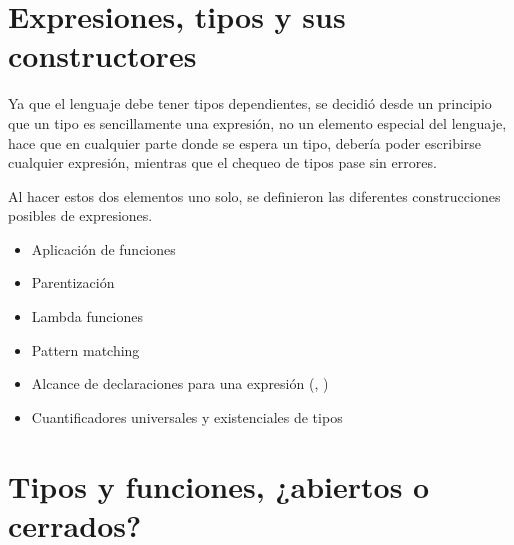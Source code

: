 \section{Expresiones, tipos y sus constructores}

\begin{blueleft}
Ya que el lenguaje debe tener tipos dependientes, se decidió desde un principio que un tipo es sencillamente una expresión, no un elemento especial del lenguaje, hace que en cualquier parte donde se espera un tipo, debería poder escribirse cualquier expresión, mientras que el chequeo de tipos pase sin errores.

Al hacer estos dos elementos uno solo, se definieron las diferentes construcciones posibles de expresiones.

\begin{itemize}
    \item Aplicación de funciones
    \item Parentización
    \item Lambda funciones
    \item Pattern matching
    \item Alcance de declaraciones para una expresión (, )
    \item Cuantificadores universales y existenciales de tipos
\end{itemize}
\end{blueleft}

\section{Tipos y funciones, ¿abiertos o cerrados?}

